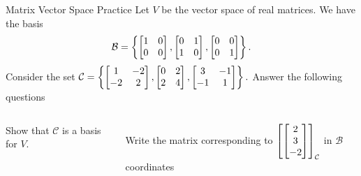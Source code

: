 \documentclass[xcoler=dvipsnames, aspectratio=169]{beamer}
\newcommand{\B}{\mathcal{B}}
\newcommand{\C}{\mathcal{C}}
\begin{document}
    \begin{frame}{Matrix Vector Space Practice}
        Let $V$ be the vector space of  real matrices. We have the
        basis
        \[
            \B=\setBasic{\bMat{1&0\\0&0}, \bMat{0&1\\1&0}, \bMat{0&0\\0&1}}.
        \]
        Consider the set
        $
            \C = \setBasic{\bMat{1&-2\\-2&2}, \bMat{0&2\\2&4}, \bMat{3&-1\\-1&1}}.
        $
        Answer the following questions
        \begin{columns}
             Show that $\C$ is a basis for $V$.

            \iftoggle{showSolutions}{
                \only<2->{
                    Set up and show 
                    \[
                        \underset{\B\leftarrow\C}{P} = \bMat{
                            1 & 0 & 3\\
                            -2 & 2 & -1\\
                            2 & 4 & 1
                        }
                    \]
                    is invertible.
                }
            }{\vspace{130pt}}
             Write the matrix corresponding to
            $
                \bCoord{\bMat{2\\3\\-2}}{\C}
            $ in $\B$ coordinates

            \iftoggle{showSolutions}{
                \only<3->{
                    \[
                        \bMat{
                            -4 & 4\\
                            4 & 14
                        }
                    \]
                }
            }{\vspace{100pt}}
        \end{columns}
    \end{frame}
\end{document}
